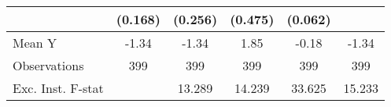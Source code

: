 {\begin{tabular}{l*{5}{c}}
            &     (0.168)         &     (0.256)         &     (0.475)         &     (0.062)         &                     \\
\midrule
Mean Y      &       -1.34         &       -1.34         &        1.85         &       -0.18         &       -1.34         \\
Observations&         399         &         399         &         399         &         399         &         399         \\
Exc. Inst. F-stat&                     &      13.289         &      14.239         &      33.625         &      15.233         \\
\bottomrule
\end{tabular}
}

